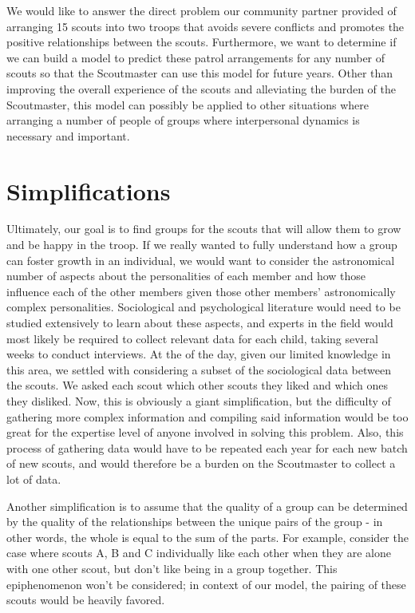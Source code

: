 \documentclass{amsart}
\theoremstyle{definition}
\theoremstyle{remark}
\numberwithin{equation}{section}
\begin{document}
We would like to answer the direct problem our community partner provided of arranging 15 scouts into two troops that avoids severe conflicts and promotes the positive relationships between the scouts. Furthermore, we want to determine if we can build a model to predict these patrol arrangements for any number of scouts so that the Scoutmaster can use this model for future years. Other than improving the overall experience of the scouts and alleviating the burden of the Scoutmaster, this model can possibly be applied to other situations where arranging a number of people of groups where interpersonal dynamics is necessary and important.

\section*{Simplifications}
Ultimately, our goal is to find groups for the scouts that will allow them to grow and be happy in the troop. If we really wanted to fully understand how a group can foster growth in an individual, we would want to consider the astronomical number of aspects about the personalities of each member and how those influence each of the other members given those other members’ astronomically complex personalities. Sociological and psychological literature would need to be studied extensively to learn about these aspects, and experts in the field would most likely be required to collect relevant data for each child, taking several weeks to conduct interviews. At the of the day, given our limited knowledge in this area, we settled with considering a subset of the sociological data between the scouts. We asked each scout which other scouts they liked and which ones they disliked. Now, this is obviously a giant simplification, but the difficulty of gathering more complex information and compiling said information would be too great for the expertise level of anyone involved in solving this problem. Also, this process of gathering data would have to be repeated each year for each new batch of new scouts, and would therefore be a burden on the Scoutmaster to collect a lot of data.

Another simplification is to assume that the quality of a group can be determined by the quality of the relationships between the unique pairs of the group - in other words, the whole is equal to the sum of the parts. For example, consider the case where scouts A, B and C individually like each other when they are alone with one other scout, but don’t like being in a group together. This epiphenomenon won’t be considered; in context of our model, the pairing of these scouts would be heavily favored. 
\end{document}
